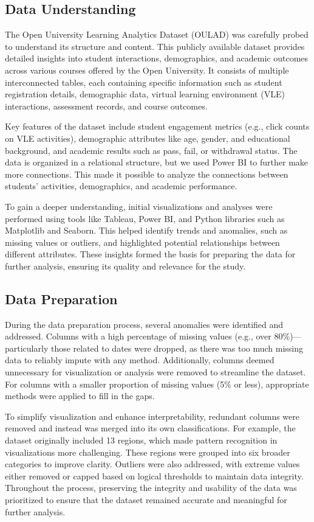 \subsection*{Data Understanding}
The Open University Learning Analytics Dataset (OULAD) was carefully probed to understand its structure and content. This publicly available dataset provides detailed insights into student interactions, demographics, and academic outcomes across various courses offered by the Open University. It consists of multiple interconnected tables, each containing specific information such as student registration details, demographic data, virtual learning environment (VLE) interactions, assessment records, and course outcomes.

Key features of the dataset include student engagement metrics (e.g., click counts on VLE activities), demographic attributes like age, gender, and educational background, and academic results such as pass, fail, or withdrawal status. The data is organized in a relational structure, but we used Power BI to further make more connections. This made it possible to analyze the connections between students' activities, demographics, and academic performance.

To gain a deeper understanding, initial visualizations and analyses were performed using tools like Tableau, Power BI, and Python libraries such as Matplotlib and Seaborn. This helped identify trends and anomalies, such as missing values or outliers, and highlighted potential relationships between different attributes. These insights formed the basis for preparing the data for further analysis, ensuring its quality and relevance for the study.

\subsection*{Data Preparation}
During the data preparation process, several anomalies were identified and addressed. Columns with a high percentage of missing values (e.g., over 80\%)—particularly those related to dates were dropped, as there was too much missing data to reliably impute with any method. Additionally, columns deemed unnecessary for visualization or analysis were removed to streamline the dataset. For columns with a smaller proportion of missing values (5\% or less), appropriate methods were applied to fill in the gaps.

To simplify visualization and enhance interpretability, redundant columns were removed and instead was merged into its own classifications. For example, the dataset originally included 13 regions, which made pattern recognition in visualizations more challenging. These regions were grouped into six broader categories to improve clarity. Outliers were also addressed, with extreme values either removed or capped based on logical thresholds to maintain data integrity. Throughout the process, preserving the integrity and usability of the data was prioritized to ensure that the dataset remained accurate and meaningful for further analysis.

